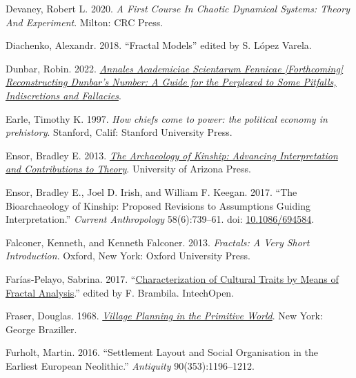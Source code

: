 \documentclass[
  12pt,
]{book}
\newlength{\cslhangindent}
\newlength{\cslentryspacingunit} %
\newenvironment{CSLReferences}[2] %
 {%
  \setlength{\parindent}{0pt}
  \ifodd #1
  \let\oldpar\par
  \def\par{\hangindent=\cslhangindent\oldpar}
  \fi
  \setlength{\parskip}{#2\cslentryspacingunit}
 }%
 {}
\begin{document}
\begin{CSLReferences}{1}{0}
\leavevmode{}%
Devaney, Robert L. 2020. \emph{A First Course In Chaotic Dynamical Systems: Theory And Experiment}. Milton: CRC Press.

\leavevmode{}%
Diachenko, Alexandr. 2018. {``Fractal Models''} edited by S. López Varela.

\leavevmode{}%
Dunbar, Robin. 2022. \emph{\href{https://doi.org/10.13140/RG.2.2.34145.58727}{Annales Academiciae Scientarum Fennicae {[}Forthcoming{]} Reconstructing Dunbar's Number: A Guide for the Perplexed to Some Pitfalls, Indiscretions and Fallacies}}.

\leavevmode{}%
Earle, Timothy K. 1997. \emph{How chiefs come to power: the political economy in prehistory}. Stanford, Calif: Stanford University Press.

\leavevmode{}%
Ensor, Bradley E. 2013. \emph{\href{https://www.jstor.org/stable/j.ctt183pcj3}{The Archaeology of Kinship: Advancing Interpretation and Contributions to Theory}}. University of Arizona Press.

\leavevmode{}%
Ensor, Bradley E., Joel D. Irish, and William F. Keegan. 2017. {``The Bioarchaeology of Kinship: Proposed Revisions to Assumptions Guiding Interpretation.''} \emph{Current Anthropology} 58(6):739--61. doi: \href{https://doi.org/10.1086/694584}{10.1086/694584}.

\leavevmode{}%
Falconer, Kenneth, and Kenneth Falconer. 2013. \emph{Fractals: A Very Short Introduction}. Oxford, New York: Oxford University Press.

\leavevmode{}%
Farías-Pelayo, Sabrina. 2017. {``\href{https://DOI:\%2010.5772/67893}{Characterization of Cultural Traits by Means of Fractal Analysis}.''} edited by F. Brambila. IntechOpen.

\leavevmode{}%
Fraser, Douglas. 1968. \emph{\href{http://archive.org/details/VillagePlanningInThePrimitiveWorld}{Village Planning in the Primitive World}}. New York: George Braziller.

\leavevmode{}%
Furholt, Martin. 2016. {``Settlement Layout and Social Organisation in the Earliest European Neolithic.''} \emph{Antiquity} 90(353):1196--1212.


\end{CSLReferences}
\end{document}
